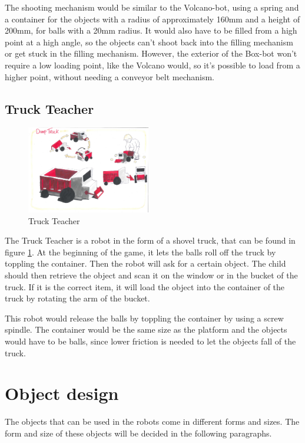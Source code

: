 \documentclass[11pt,twoside,a4paper]{report}
\begin{document}
The shooting mechanism would be similar to the Volcano-bot, using a spring and a container for the objects with a radius of approximately 160mm and a height of 200mm, for balls with a 20mm radius. It would also have to be filled from a high point at a high angle, so the objects can\rq{}t shoot back into the filling mechanism or get stuck in the filling mechanism. However, the exterior of the Box-bot won\rq{}t require a low loading point, like the Volcano would, so it\rq{}s possible to load from a higher point, without needing a conveyor belt mechanism.

\section{Truck Teacher}
\begin{figure}
  \begin{center}
    \includegraphics[width=0.48\textwidth]{Images/TruckTeacherConcept.pdf}
  \end{center}
  \caption{Truck Teacher}
  \label{figure:truckteacher}
\end{figure}
The Truck Teacher is a robot in the form of a shovel truck, that can be found in figure \ref{figure:truckteacher}. At the beginning of the game, it lets the balls roll off the truck by toppling the container. Then the robot will ask for a certain object. The child should then retrieve the object and scan it on the window or in the bucket of the truck. If it is the correct item, it will load the object into the container of the truck by rotating the arm of the bucket.

This robot would release the balls by toppling the container by using a screw spindle. The container would be the same size as the platform and the objects would have to be balls, since lower friction is needed to let the objects fall of the truck.

\chapter{Object design}
The objects that can be used in the robots come in different forms and sizes. The form and size of these objects will be decided in the following paragraphs. 
\end{document}
